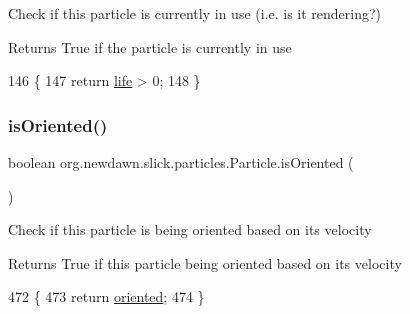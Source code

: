Check if this particle is currently in use (i.\+e. is it rendering?)

\begin{DoxyReturn}{Returns}
True if the particle is currently in use 
\end{DoxyReturn}

\begin{DoxyCode}
146                            \{
147         \textcolor{keywordflow}{return} \mbox{\hyperlink{classorg_1_1newdawn_1_1slick_1_1particles_1_1_particle_a361d2a9d01b66d38d90496c096970aab}{life}} > 0;
148     \}
\end{DoxyCode}
\mbox{\label{classorg_1_1newdawn_1_1slick_1_1particles_1_1_particle_af44a98acb64ff4d91981716b088e977d}} 
\subsubsection{\texorpdfstring{is\+Oriented()}{isOriented()}}
{\footnotesize\ttfamily boolean org.\+newdawn.\+slick.\+particles.\+Particle.\+is\+Oriented (\begin{DoxyParamCaption}{ }\end{DoxyParamCaption})\hspace{0.3cm}{\ttfamily [inline]}}

Check if this particle is being oriented based on it\textquotesingle{}s velocity

\begin{DoxyReturn}{Returns}
True if this particle being oriented based on it\textquotesingle{}s velocity 
\end{DoxyReturn}

\begin{DoxyCode}
472                                 \{
473         \textcolor{keywordflow}{return} \mbox{\hyperlink{classorg_1_1newdawn_1_1slick_1_1particles_1_1_particle_ad5b898bd35ce1b209c5f6372b1667fc2}{oriented}};
474     \}
\end{DoxyCode}
\mbox{\label{classorg_1_1newdawn_1_1slick_1_1particles_1_1_particle_afd46aec9df92c7aeaa293fe2221146cd}} 
